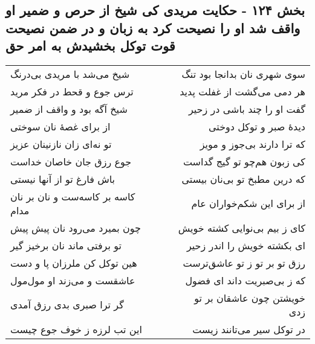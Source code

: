 \begin{center}
\section*{بخش ۱۲۴ - حکایت مریدی کی شیخ از حرص و ضمیر او واقف شد او را نصیحت کرد به زبان و در ضمن نصیحت قوت توکل بخشیدش به امر حق}
\label{sec:sh124}
\begin{longtable}{l p{0.5cm} r}
شیخ می‌شد با مریدی بی‌درنگ
&&
سوی شهری نان بدانجا بود تنگ
\\
ترس جوع و قحط در فکر مرید
&&
هر دمی می‌گشت از غفلت پدید
\\
شیخ آگه بود و واقف از ضمیر
&&
گفت او را چند باشی در زحیر
\\
از برای غصهٔ نان سوختی
&&
دیدهٔ صبر و توکل دوختی
\\
تو نه‌ای زان نازنینان عزیز
&&
که ترا دارند بی‌جوز و مویز
\\
جوع رزق جان خاصان خداست
&&
کی زبون هم‌چو تو گیج گداست
\\
باش فارغ تو از آنها نیستی
&&
که درین مطبخ تو بی‌نان بیستی
\\
کاسه بر کاسه‌ست و نان بر نان مدام
&&
از برای این شکم‌خواران عام
\\
چون بمیرد می‌رود نان پیش پیش
&&
کای ز بیم بی‌نوایی کشته خویش
\\
تو برفتی ماند نان برخیز گیر
&&
ای بکشته خویش را اندر زحیر
\\
هین توکل کن ملرزان پا و دست
&&
رزق تو بر تو ز تو عاشق‌ترست
\\
عاشقست و می‌زند او مول‌مول
&&
که ز بی‌صبریت داند ای فضول
\\
گر ترا صبری بدی رزق آمدی
&&
خویشتن چون عاشقان بر تو زدی
\\
این تب لرزه ز خوف جوع چیست
&&
در توکل سیر می‌تانند زیست
\\
\end{longtable}
\end{center}
